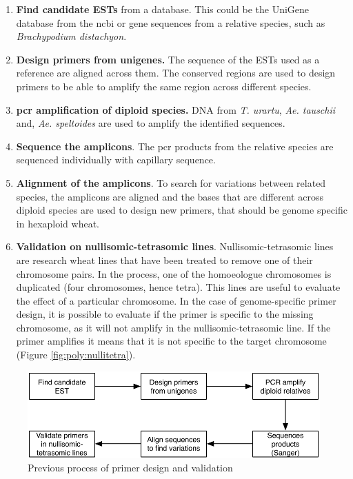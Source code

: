 \begin{enumerate}
    \item \textbf{Find candidate ESTs} from a database. This could be the UniGene database from the \gls{ncbi} or gene sequences from a relative species, such as \textit{Brachypodium distachyon}.
    \item \textbf{Design primers from unigenes.} The sequence of the ESTs used as a reference are aligned across them. The conserved regions are used to design primers to be able to amplify the same region across different species.
    \item \textbf{\gls{pcr} amplification of diploid species.} DNA from \textit{T. urartu}, \textit{Ae. tauschii} and, \textit{Ae. speltoides} are used to amplify the identified sequences. 
    \item \textbf{Sequence the amplicons}. The \gls{pcr} products from the relative species are sequenced individually with capillary sequence. 
    \item \textbf{Alignment of the amplicons}. To search for variations between related species, the amplicons are aligned and the bases that are different across diploid species are used to design new primers, that should be genome specific in hexaploid wheat. 
    \item \textbf{Validation on nullisomic-tetrasomic lines}. 
Nullisomic-tetrasomic lines are research wheat lines that have been treated to remove one of their chromosome pairs. 
In the process, one of the homoeologue chromosomes is duplicated (four chromosomes, hence tetra).
This lines are useful to evaluate the effect of a particular chromosome. 
In the case of genome-specific primer design, it is possible to evaluate if the primer is specific to the missing chromosome, as it will not amplify in the nullisomic-tetrasomic line. 
If the primer amplifies it means that it is not specific to the target chromosome 
(Figure \ref{fig:poly:nullitetra}).
\end{enumerate}

\begin{figure}
\includegraphics[width=1\textwidth]{PolyMarker/Figures/disc/OldGSP.pdf}
\caption{Previous process of primer design and validation}
\label{fig:poly:oldGSP}
\end{figure}


